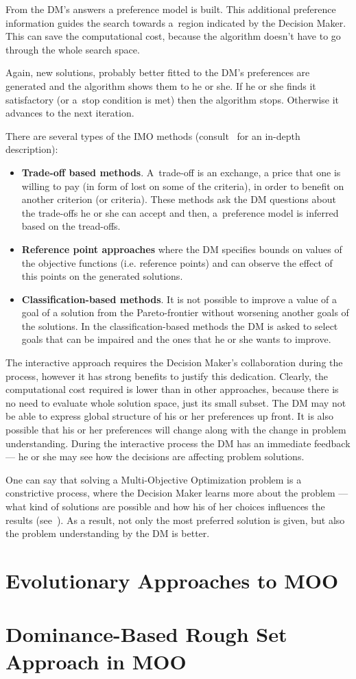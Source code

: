 From the DM's answers a preference model is built. This additional preference
information guides the search towards a~region indicated by the Decision
Maker. This can save the computational cost, because the algorithm doesn't
have to go through the whole search space.

Again, new solutions, probably better fitted to the DM's preferences are
generated and the algorithm shows them to he or she. If he or she finds it
satisfactory (or a~stop condition is met) then the algorithm stops. Otherwise
it advances to the next iteration.

There are several types of the IMO methods (consult~\cite{MRW08} for an
in-depth description):
\begin{itemize}
\item \textbf{Trade-off based methods}. A~trade-off is an exchange, a price that
  one is willing to pay (in form of lost on some of the criteria), in order to
  benefit on another criterion (or criteria). These methods ask the DM
  questions about the trade-offs he or she can accept and then, a~preference
  model is inferred based on the tread-offs.
\item \textbf{Reference point approaches} where the DM specifies bounds on
  values of the objective functions (i.e. reference points) and can observe
  the effect of this points on the generated solutions.
\item \textbf{Classification-based methods}. It is not possible to improve a
  value of a goal of a solution from the Pareto-frontier without worsening
  another goals of the solutions. In the classification-based methods the DM
  is asked to select goals that can be impaired and the ones that he or she
  wants to improve.
\end{itemize}

The interactive approach requires the Decision Maker's collaboration during
the process, however it has strong benefits to justify this
dedication. Clearly, the computational cost required is lower than in other
approaches, because there is no need to evaluate whole solution space, just
its small subset. The DM may not be able to express global structure of his or
her preferences up front. It is also possible that his or her preferences will
change along with the change in problem understanding. During the interactive
process the DM has an immediate feedback --- he or she may see how the
decisions are affecting problem solutions.

One can say that solving a Multi-Objective Optimization problem is a
constrictive process, where the Decision Maker learns more about the problem
--- what kind of solutions are possible and how his of her choices influences
the results (see~\cite{MRW08}). As a result, not only the most preferred
solution is given, but also the problem understanding by the DM is better.


\section{Evolutionary Approaches to MOO}
\label{sec_ea_in_moo}


\section{Dominance-Based Rough Set Approach in MOO}
\label{sec_drsa_in_moo}


